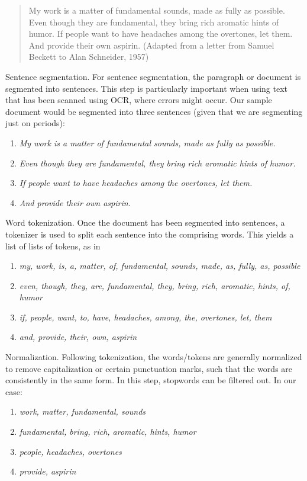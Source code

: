 \begin{quote}
My work is a matter of fundamental sounds, made as fully as possible. Even though they are fundamental, they bring rich aromatic hints of humor. If people want to have headaches among the overtones, let them. And provide their own aspirin. (Adapted from a letter from Samuel Beckett to Alan Schneider, 1957)
\end{quote}

Sentence segmentation.  For sentence segmentation, the paragraph or document is segmented into sentences. This step is particularly important when using text that has been scanned using OCR, where errors might occur. Our sample document would be segmented into three sentences (given that we are segmenting just on periods):

\begin{enumerate}
    \item \textit{My work is a matter of fundamental sounds, made as fully as possible.}
    \item \textit{Even though they are fundamental, they bring rich aromatic hints of humor.}
    \item \textit{If people want to have headaches among the overtones, let them.}
    \item \textit{And provide their own aspirin.}
\end{enumerate}

Word tokenization. Once the document has been segmented into sentences, a tokenizer is used to split each sentence into the comprising words. This yields a list of lists of tokens, as in
\begin{enumerate}
    \item \textit{my, work, is, a, matter, of, fundamental, sounds, made, as, fully, as, possible}
    \item \textit{even, though, they, are, fundamental, they, bring, rich, aromatic, hints, of, humor}
    \item \textit{if, people, want, to, have, headaches, among, the, overtones, let, them}
    \item \textit{and, provide, their, own, aspirin}
\end{enumerate}

Normalization. Following tokenization, the words/tokens are generally normalized to remove capitalization or certain punctuation marks, such that the words are consistently in the same form. In this step, stopwords can be filtered out. In our case:
\begin{enumerate}
    \item \textit{work, matter, fundamental, sounds}
    \item \textit{fundamental, bring, rich, aromatic, hints, humor}
    \item \textit{people, headaches, overtones}
    \item \textit{provide, aspirin}
\end{enumerate}

